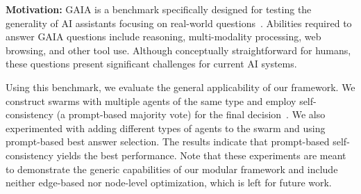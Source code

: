 \documentclass{article}
\theoremstyle{plain}
\theoremstyle{definition}
\theoremstyle{remark}
\begin{document}
\noindent \textbf{Motivation:} 
GAIA is a benchmark specifically designed for testing the generality of AI assistants focusing on real-world questions~\citep{mialon2023gaia}.
Abilities required to answer GAIA questions include reasoning, multi-modality processing, web browsing, and other tool use.
Although conceptually straightforward for humans, these questions present significant challenges for current AI systems.

Using this benchmark, we evaluate the general applicability of our framework.
We construct swarms with multiple agents of the same type and employ self-consistency (a prompt-based majority vote) for the final decision~\cite{wang2022self}.
We also experimented with adding different types of agents to the swarm and using prompt-based best answer selection.
The results indicate that prompt-based self-consistency yields the best performance.
Note that these experiments are meant to demonstrate the generic capabilities of our modular framework and include neither edge-based nor node-level optimization, which is left for future work.
\end{document}
